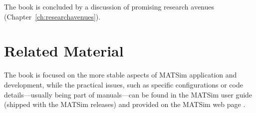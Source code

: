 The book is concluded by a discussion of promising research avenues (Chapter~\ref{ch:researchavenues}).

\section*{Related Material}
The book is focused on the more stable aspects of MATSim application and development, while the practical issues, such as specific configurations or code details---usually being part of manuals---can be found in the MATSim user guide (shipped with the MATSim releases) and provided on the MATSim web page \citep[][]{MATSim_Userguide_2014}.

